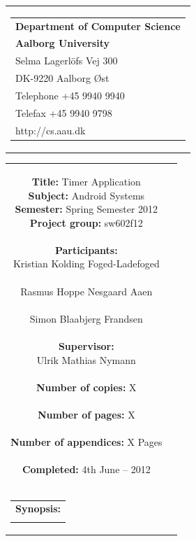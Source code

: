 \begin{nopagebreak}
\samepage 
\begin{tabular}{r}
\parbox{\textwidth}{
\hfill \parbox{6.2cm}{\begin{tabular}{l}
{\textsf\small \textbf{Department of Computer Science }}\\
{\textsf\small  \textbf{Aalborg University}}\\
{\textsf\small Selma Lagerlöfs Vej 300}\\
{\textsf\small DK-9220 Aalborg Øst}\\
{\textsf\small Telephone +45 9940 9940}\\
{\textsf\small Telefax +45 9940 9798}\\
{\textsf\small http://cs.aau.dk}
\end{tabular}}}
\end{tabular}

\begin{tabular}{cc}
\parbox{7cm}{
\textbf{Title:} 
Timer Application\\
\textbf{Subject:} 
Android Systems\\
\textbf{Semester:} Spring Semester 2012\\
\textbf{Project group:} sw602f12\\ \\
\textbf{Participants:} \\
Kristian Kolding Foged-Ladefoged \\ \\
Rasmus Hoppe Nesgaard Aaen \\ \\
Simon Blaabjerg Frandsen \\ \\
\textbf{Supervisor:} \\
Ulrik Mathias Nymann\\ \\
\textbf{Number of copies:}
X \\ \\
\textbf{Number of pages:}
X \\ \\
\textbf{Number of appendices:}
X Pages\\ \\
\textbf{Completed:}
4th June -- 2012 \\ \\
}

\parbox{7cm}{
\vspace{.15cm}
\hfill 
\begin{tabular}{l}
\textbf{Synopsis:} \\
\fbox{
\parbox{6.5cm}{
{\vfill{\small {}\bigskip}}
}}
\end{tabular}}
\end{tabular}


\end{nopagebreak}